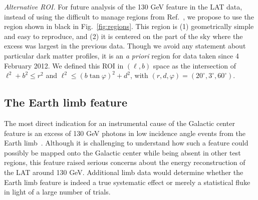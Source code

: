 \documentclass[aps,prd,superscriptaddress,nofootinbib,fixlfloat, 12pt]{revtex4-1}
\begin{document}
\emph{Alternative ROI.} For future analysis of the 130 GeV feature in the LAT
data, instead of using the difficult to manage regions from
Ref.~\cite{Weniger:2012}, we propose to use the region shown in black in
Fig.~\ref{fig:regions}. This region is (1) geometrically simple and easy to reproduce, and (2)
it is centered on the part of the sky where the excess was largest in the
previous data. Though we avoid any statement about particular dark matter
profiles, it is an \emph{a priori} region for data taken since 4 February
2012. We defined this ROI in $(\ell, b)$ space as the intersection of
$\ell^2+b^2\leq
r^2$ and $\ell^2\leq (b\tan\varphi)^2 + d^2$, with $(r, d, \varphi) =
(20^\circ, 3^\circ, 60^\circ)$. 

\subsection{The Earth limb feature}
The most direct indication for an instrumental cause of the Galactic center
feature is an excess of 130 GeV photons in low incidence angle events from
the Earth limb~\cite{linepaper, finkbeiner_systematics, Hektor:2012ev,
bloom_charles_fermi_lat_line}. Although it is challenging to understand how
such a feature could possibly be mapped onto the Galactic center while being
absent in other test regions, this feature raised serious concerns about the
energy reconstruction of the LAT around 130 GeV.  Additional limb data would
determine whether the Earth limb feature is indeed a true systematic effect or
merely a statistical fluke in light of a large number of trials.
\end{document}
